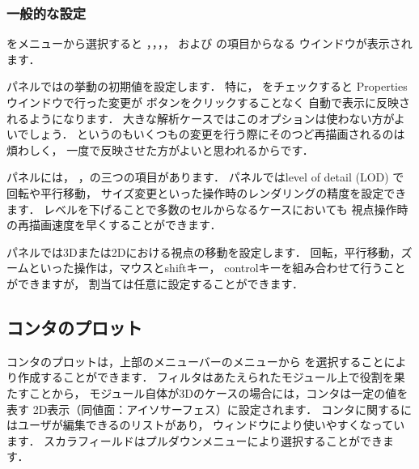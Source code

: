 \subsubsection{一般的な設定}
\label{sssec:6.1.5.2}
%
%
をメニューから選択すると
，，，，
および
%
%
の項目からなる
%
%
ウインドウが表示されます．

パネルではの挙動の初期値を設定します．
特に，
%
%
をチェックすると
Propertiesウインドウで行った変更が
%
%
ボタンをクリックすることなく
自動で表示に反映されるようになります．
大きな解析ケースではこのオプションは使わない方がよいでしょう．
というのもいくつもの変更を行う際にそのつど再描画されるのは煩わしく，
一度で反映させた方がよいと思われるからです．

%
%
パネルには，
，の三つの項目があります．
パネルではlevel of detail (LOD) で回転や平行移動，
サイズ変更といった操作時のレンダリングの精度を設定できます．
レベルを下げることで多数のセルからなるケースにおいても
視点操作時の再描画速度を早くすることができます．

パネルでは3Dまたは2Dにおける視点の移動を設定します．
回転，平行移動，ズームといった操作は，マウスとshiftキー，
controlキーを組み合わせて行うことができますが，
割当ては任意に設定することができます．


\subsection{コンタのプロット}
\label{ssec:6.1.6}
コンタのプロットは，上部のメニューバーのメニューから
を選択することにより作成することができます．
フィルタはあたえられたモジュール上で役割を果たすことから，
モジュール自体が3Dのケースの場合には，コンタは一定の値を表す
2D表示（同値面：アイソサーフェス）に設定されます．
コンタに関するにはユーザが編集できるのリストがあり，
ウィンドウにより使いやすくなっています．
スカラフィールドはプルダウンメニューにより選択することができます．

